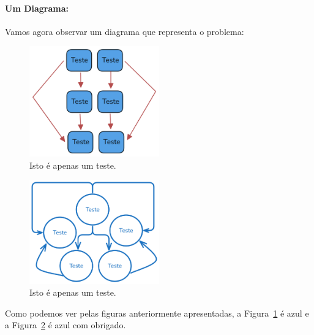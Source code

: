 \paragraph{Um Diagrama:} Vamos agora observar um diagrama que representa o problema:

\begin{figure}[htb!]
    \centering
    \includegraphics[width=0.5\textwidth]{figures/teste}
    \caption{Isto é apenas um teste.}
    \label{fig:teste}
\end{figure}

\begin{figure}[htb!]
    \centering
    \includegraphics[width=0.5\textwidth]{figures/diagrama}
    \caption{Isto é apenas um teste.}
    \label{fig:diagrama}
\end{figure}

Como podemos ver pelas figuras anteriormente apresentadas, a Figura~\ref{fig:teste} é azul e a Figura~\ref{fig:diagrama} é azul com obrigado.